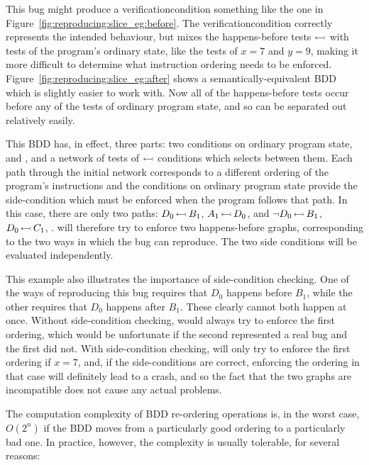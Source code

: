 This bug might produce a \gls{verificationcondition} something like
the one in Figure~\ref{fig:reproducing:slice_eg:before}.  The
\gls{verificationcondition} correctly represents the intended
behaviour, but mixes the happens-before tests $\leftarrowtail$
with tests of the program's ordinary state, like the tests of $x = 7$
and $y = 9$, making it more difficult to determine what instruction
ordering needs to be enforced.
Figure~\ref{fig:reproducing:slice_eg:after} shows a
semantically-equivalent BDD which is slightly easier to work with.
Now all of the happens-before tests occur before any of the tests of
ordinary program state, and so can be separated out relatively easily.

This BDD has, in effect, three parts: two conditions on ordinary
program state,  and , and a network of tests of
$\leftarrowtail$ conditions which selects between them.  Each path
through the initial network corresponds to a different ordering of the
program's instructions and the conditions on ordinary program state
provide the side-condition which must be enforced when the program
follows that path.  In this case, there are only two paths:
$D_0\,{\leftarrowtail}\,B_1$, $A_1\,{\leftarrowtail}\,D_0$, 
and ${\neg}D_0\,{\leftarrowtail}\,B_1$, $D_0\,{\leftarrowtail}\,C_1$,
.  {\Technique} will therefore try to enforce two
happens-before graphs, corresponding to the two ways in which the bug
can reproduce.  The two side conditions will be evaluated
independently.

This example also illustrates the importance of side-condition
checking.  One of the ways of reproducing this bug requires that $D_0$
happens before $B_1$, while the other requires that $D_0$ happens
after $B_1$.  These clearly cannot both happen at once.  Without
side-condition checking, {\technique} would always try to enforce the
first ordering, which would be unfortunate if the second represented a
real bug and the first did not.  With side-condition checking,
{\technique} will only try to enforce the first ordering if $x = 7$,
and, if the side-conditions are correct, enforcing the ordering in
that case will definitely lead to a crash, and so the fact that the
two graphs are incompatible does not cause any actual problems.

The computation complexity of BDD re-ordering operations is, in the
worst case, $O(2^n)$ if the BDD moves from a particularly good
ordering to a particularly bad one.  In practice, however, the
complexity is usually tolerable, for several reasons:

